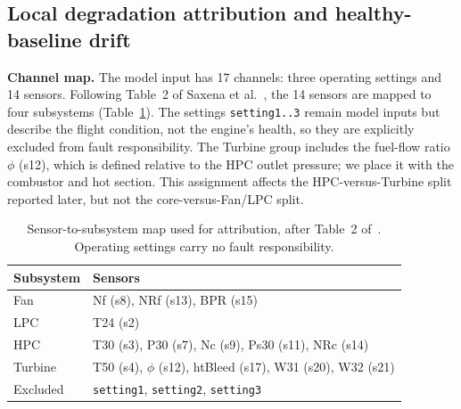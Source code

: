 \subsection{Local degradation attribution and healthy-baseline drift}
\label{sec:method-diag}
\textbf{Channel map.} The model input has 17 channels: three operating settings and 14 sensors. Following Table~2 of Saxena et al.~\cite{saxena2008damage}, the 14 sensors are mapped to four subsystems (Table~\ref{tab:channels}). The settings \texttt{setting1..3} remain model inputs but describe the flight condition, not the engine's health, so they are explicitly excluded from fault responsibility. The Turbine group includes the fuel-flow ratio $\phi$ (s12), which is defined relative to the HPC outlet pressure; we place it with the combustor and hot section. This assignment affects the HPC-versus-Turbine split reported later, but not the core-versus-Fan/LPC split.

\begin{table}[t]
\centering
\caption{Sensor-to-subsystem map used for attribution, after Table~2 of~\cite{saxena2008damage}. Operating settings carry no fault responsibility.}
\label{tab:channels}
\footnotesize
\begin{tabular}{@{}lp{}@{}}
\toprule
Subsystem & Sensors \\
\midrule
Fan & Nf (s8), NRf (s13), BPR (s15) \\
LPC & T24 (s2) \\
HPC & T30 (s3), P30 (s7), Nc (s9), Ps30 (s11), NRc (s14) \\
Turbine & T50 (s4), $\phi$ (s12), htBleed (s17), W31 (s20), W32 (s21) \\
Excluded & \texttt{setting1}, \texttt{setting2}, \texttt{setting3} \\
\bottomrule
\end{tabular}
\end{table}

